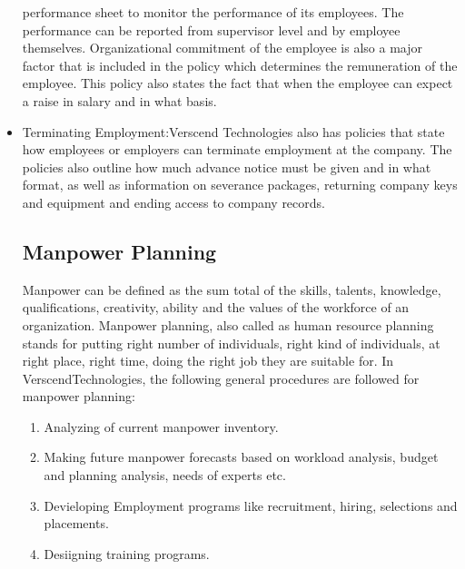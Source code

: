 \begin{itemize}
performance sheet to monitor the performance of its employees. The performance can be reported from
supervisor level and by employee themselves. Organizational commitment of the employee is also a
major factor that is included in the policy which determines the remuneration of the employee. This
policy also states the fact that when the employee can expect a raise in salary and in what basis.
\item Terminating Employment:Verscend Technologies also has policies that state how
employees or employers can terminate employment at the company. The policies also outline how
much advance notice must be given and in what format, as well as information on severance packages,
returning company keys and equipment and ending access to company records.
\subsection{Manpower Planning}
Manpower can be defined as the sum total of the skills, talents, knowledge, qualifications, creativity, ability
and the values of the workforce of an organization. Manpower planning, also called as human resource
planning stands for putting right number of individuals, right kind of individuals, at right place, right time,
doing the right job they are suitable for.
In VerscendTechnologies, the following general procedures are followed for manpower planning:
\begin{enumerate}
\item
 Analyzing of current manpower inventory.
\item
 Making future manpower forecasts based on workload analysis, budget and planning analysis, needs
of experts etc.
\item
 Devieloping Employment programs like recruitment, hiring, selections and placements.
\item
 Desiigning training programs.
\end{enumerate}

\end{itemize}
